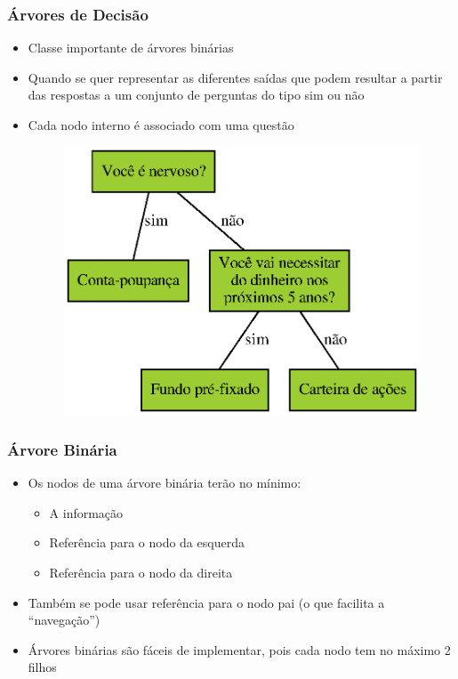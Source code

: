 \documentclass[aspectratio=169]{beamer}
\begin{document}
\begin{frame}[fragile]\frametitle{Árvores de Decisão}
\begin{itemize}
	\item Classe importante de árvores binárias
	\item Quando se quer representar as diferentes saídas que podem resultar a partir das respostas a um conjunto de perguntas do tipo sim ou não
	\item Cada nodo interno é associado com uma questão
\begin{figure}[h]
	\centering
	\includegraphics[height=0.5\paperheight]{imagens/arvore_de_decisao2.eps}
\end{figure}
\end{itemize}
\end{frame}

\begin{frame}\frametitle{Árvore Binária}
\begin{itemize}
	\item  Os nodos de uma árvore binária terão no mínimo:
	\begin{itemize}
		\item A informação
		\item Referência para o nodo da esquerda
		\item Referência para o nodo da direita
	\end{itemize}
	\item Também se pode usar referência para o nodo pai (o que facilita a ``navegação'')
	\item Árvores binárias são fáceis de implementar, pois cada nodo tem no máximo 2 filhos	
\end{itemize}
\end{frame}
\end{document}
